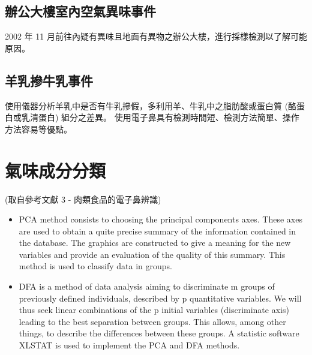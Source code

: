 	\subsection{辦公大樓室內空氣異味事件}
	2002 年 11 月前往內疑有異味且地面有異物之辦公大樓，進行採樣檢測以了解可能原因。
	\subsection{羊乳摻牛乳事件}
	使用儀器分析羊乳中是否有牛乳摻假，多利用羊、牛乳中之脂肪酸或蛋白質 (酪蛋白或乳清蛋白) 組分之差異。
	使用電子鼻具有檢測時間短、檢測方法簡單、操作方法容易等優點。

\section{氣味成分分類}
(取自參考文獻 3 - 肉類食品的電子鼻辨識)
\begin{itemize}
	\item PCA method consists to choosing the principal components axes. 
	These axes are used to obtain a quite precise summary of the information 
	contained in the database. The graphics are constructed to give a meaning for 
	the new variables and provide an evaluation of the quality of this summary. 
	This method is used to classify data in groups. 
	\item DFA is a method of data analysis aiming to discriminate m groups of 
	previously defined individuals, described by p quantitative variables. We will 
	thus seek linear combinations of the p initial variables (discriminate axis) 
	leading to the best separation between groups. This allows, among other things, 
	to describe the differences between these groups. A statistic software XLSTAT 
	is used to implement the PCA and DFA methods. 
\end{itemize}